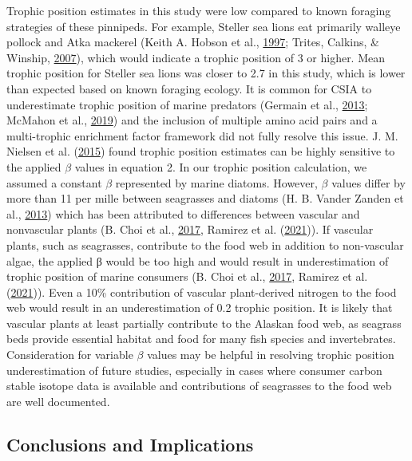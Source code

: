 \documentclass [11pt, proquest] {uwthesis}[2015/03/03]
\begin{document}
Trophic position estimates in this study were low compared to known
foraging strategies of these pinnipeds. For example, Steller sea lions
eat primarily walleye pollock and Atka mackerel (Keith A. Hobson et al.,
\protect\hyperlink{ref-Hobson1997}{1997}; Trites, Calkins, \& Winship,
\protect\hyperlink{ref-Trites2007}{2007}), which would indicate a
trophic position of 3 or higher. Mean trophic position for Steller sea
lions was closer to 2.7 in this study, which is lower than expected
based on known foraging ecology. It is common for CSIA to underestimate
trophic position of marine predators (Germain et al.,
\protect\hyperlink{ref-Germain2013}{2013}; McMahon et al.,
\protect\hyperlink{ref-McMahon2019}{2019}) and the inclusion of multiple
amino acid pairs and a multi-trophic enrichment factor framework did not
fully resolve this issue. J. M. Nielsen et al.
(\protect\hyperlink{ref-Nielsen2015}{2015}) found trophic position
estimates can be highly sensitive to the applied \(\beta\) values in
equation 2. In our trophic position calculation, we assumed a constant
\(\beta\) represented by marine diatoms. However, \(\beta\) values
differ by more than 11 per mille between seagrasses and diatoms (H. B.
Vander Zanden et al., \protect\hyperlink{ref-VanderZanden2013}{2013})
which has been attributed to differences between vascular and
nonvascular plants (B. Choi et al.,
\protect\hyperlink{ref-Choi2017}{2017}, Ramirez et al.
(\protect\hyperlink{ref-Ramirez2021}{2021})). If vascular plants, such
as seagrasses, contribute to the food web in addition to non-vascular
algae, the applied β would be too high and would result in
underestimation of trophic position of marine consumers (B. Choi et al.,
\protect\hyperlink{ref-Choi2017}{2017}, Ramirez et al.
(\protect\hyperlink{ref-Ramirez2021}{2021})). Even a 10\% contribution
of vascular plant-derived nitrogen to the food web would result in an
underestimation of 0.2 trophic position. It is likely that vascular
plants at least partially contribute to the Alaskan food web, as
seagrass beds provide essential habitat and food for many fish species
and invertebrates. Consideration for variable \(\beta\) values may be
helpful in resolving trophic position underestimation of future studies,
especially in cases where consumer carbon stable isotope data is
available and contributions of seagrasses to the food web are well
documented.

\subsection{Conclusions and
Implications}\label{conclusions-and-implications}
\end{document}
